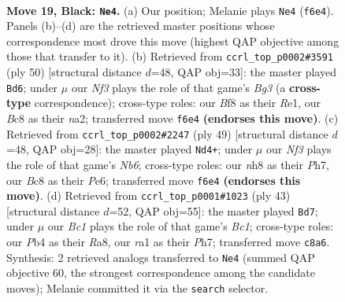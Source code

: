 \documentclass[11pt]{article}
\begin{document}
\clearpage

\begin{figure}[p]\centering
\begin{subfigure}{0.46\textwidth}\centering
\resizebox{\linewidth}{!}{%
\newchessgame
\chessboard[
  setfen={r1b2b1N/2k4p/2p1pnp1/2P5/Pp3P1P/4P3/8/RNB3K1 b - a3 0 19},
  showmover=false,
  pgfstyle=straightmove, color=movearrow, markmove={f6-e4}
]}
\caption{}
\end{subfigure}\hfill
\begin{subfigure}{0.46\textwidth}\centering
\resizebox{\linewidth}{!}{%
\newchessgame
\chessboard[
  setfen={2r3k1/p6p/1p3b2/6p1/N1P1p1P1/1P4B1/n4PP1/4R1K1 w - - 0 26},
  showmover=false,
  pgfstyle=straightmove, color=movearrow, markmove={g3-d6}
]}
\caption{}
\end{subfigure}
\\[4pt]
\begin{subfigure}{0.46\textwidth}\centering
\resizebox{\linewidth}{!}{%
\newchessgame
\chessboard[
  setfen={2r3k1/5ppp/1p2p3/7P/2P5/PnN2b2/1PK2P1P/5BR1 b - - 8 25},
  showmover=false,
  pgfstyle=straightmove, color=movearrow, markmove={b3-d4}
]}
\caption{}
\end{subfigure}\hfill
\begin{subfigure}{0.46\textwidth}\centering
\resizebox{\linewidth}{!}{%
\newchessgame
\chessboard[
  setfen={r1b5/p4kbp/1p2p1p1/1N2P3/2Pp4/3B4/PP4PP/4R2K b - - 3 22},
  showmover=false,
  pgfstyle=straightmove, color=movearrow, markmove={c8-d7}
]}
\caption{}
\end{subfigure}
\caption{\textbf{Move 19, Black: \texttt{Ne4}.} (a) Our position; Melanie plays \texttt{Ne4} (\texttt{f6e4}). Panels (b)--(d) are the retrieved master positions whose correspondence most drove this move (highest QAP objective among those that transfer to it). (b) Retrieved from \texttt{ccrl\_top\_p0002\#3591} (ply 50) [structural distance $d$=48, QAP obj=33]: the master played \texttt{Bd6}; under $\mu$ our \emph{Nf3} plays the role of that game's \emph{Bg3} (a \textbf{cross-type} correspondence); cross-type roles: our \emph{B}f8 as their \emph{R}e1, our \emph{B}c8 as their \emph{n}a2; transferred move \texttt{f6e4} \textbf{(endorses this move)}. (c) Retrieved from \texttt{ccrl\_top\_p0002\#2247} (ply 49) [structural distance $d$=48, QAP obj=28]: the master played \texttt{Nd4+}; under $\mu$ our \emph{Nf3} plays the role of that game's \emph{Nb6}; cross-type roles: our \emph{n}h8 as their \emph{P}h7, our \emph{B}c8 as their \emph{P}e6; transferred move \texttt{f6e4} \textbf{(endorses this move)}. (d) Retrieved from \texttt{ccrl\_top\_p0001\#1023} (ply 43) [structural distance $d$=52, QAP obj=55]: the master played \texttt{Bd7}; under $\mu$ our \emph{Bc1} plays the role of that game's \emph{Bc1}; cross-type roles: our \emph{P}b4 as their \emph{R}a8, our \emph{r}a1 as their \emph{P}h7; transferred move \texttt{c8a6}. Synthesis: 2 retrieved analogs transferred to \texttt{Ne4} (summed QAP objective 60, the strongest correspondence among the candidate moves); Melanie committed it via the \texttt{search} selector.}
\label{fig:thought-m37}
\end{figure}
\end{document}
